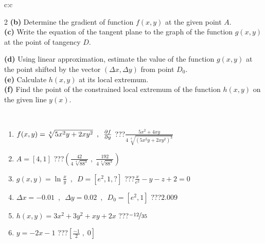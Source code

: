 \documentclass[10pt]{report}
\begin{document}
\begin{tabular}{c:c}
\begin{minipage}[c][104.5mm][t]{0.5\linewidth}
\begin{center}
\begin{minipage}{0.95\linewidth}
\begin{center}
{\begin{multicols}{2}
\textbf{(b)} Determine the gradient of function \(f(x,y)\) at the given point \(A\). \\[1mm]
\textbf{(c)} Write the equation of the tangent plane to the graph of the function \(g(x,y)\) at the point of tangency \(D\). \par \columnbreak
\textbf{(d)} Using linear approximation, estimate the value of the function \(g(x,y)\) at the point shifted by the vector \((\Delta x, \Delta y)\) from point \(D_0\). \\[1mm]
\textbf{(e)} Calculate \(h(x,y)\) at its local extremum. \\[1mm]
\textbf{(f)} Find the point of the constrained local extremum of the function \(h(x,y)\) on the given line \(y(x)\). \\[1mm]
\end{multicols}
}
\end{center}
\end{minipage}
\\[4mm]
\begin{minipage}{0.79\linewidth}
\begin{center}
\begin{varwidth}{\linewidth}
\begin{enumerate}
\normalsizerr
\item $f(x,y) = \sqrt[4]{5x^2y + 2xy^2}\enspace , \enspace \pdv{f}{y}$\quad \dotfill\; ???\;\dotfill \quad $\frac{5x^2+4xy}{4\,\sqrt[4]{(5x^2y+2xy^2)^{3}}}$
\item $A = [4, 1]$\quad \dotfill\; ???\;\dotfill \quad $\left( \frac{42}{4\,\sqrt[4]{88^3}} \;,\; \frac{192}{4\,\sqrt[4]{88^3}} \right)$
\item $g(x,y) = \ln\frac{x}{y} \enspace , \enspace D=[e^{2},1,?]$\quad \dotfill\; ???\;\dotfill \quad $\frac{x}{e^2} - y - z + 2 = 0$
\item $\Delta x = {-0.01} \enspace,\enspace \Delta y = {0.02} \enspace,\enspace D_0 = [e^{2},1]$\quad \dotfill\; ???\;\dotfill \quad $2.009$
\item $h(x,y) = 3x^2+3y^2+xy+2x$\quad \dotfill\; ???\;\dotfill \quad $\nicefrac{-12}{35}$
\item $y = -2x-1$\quad \dotfill\; ???\;\dotfill \quad $\left[\frac{-1}{2}\;,\;0\right]$
\end{enumerate}
\end{varwidth}
\end{center}
\end{minipage}
\begin{minipage}{0.20\linewidth}
\begin{center}

\end{center}
\end{minipage}
\end{center}
\end{minipage}
\end{tabular}
\end{document}
